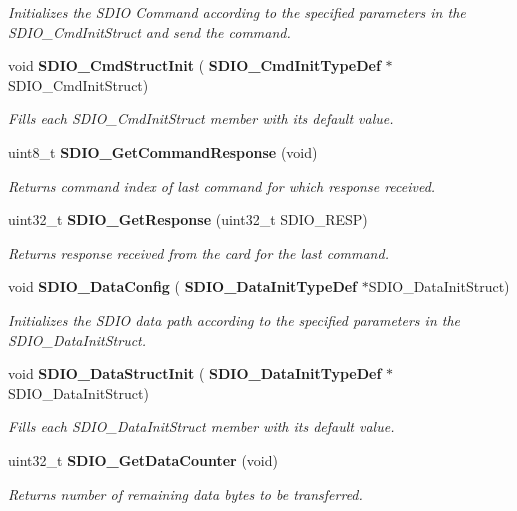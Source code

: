 \begin{DoxyCompactItemize}
\begin{DoxyCompactList}\small\item\em Initializes the S\+D\+IO Command according to the specified parameters in the S\+D\+I\+O\+\_\+\+Cmd\+Init\+Struct and send the command. \end{DoxyCompactList}\item 
void \textbf{ S\+D\+I\+O\+\_\+\+Cmd\+Struct\+Init} (\textbf{ S\+D\+I\+O\+\_\+\+Cmd\+Init\+Type\+Def} $\ast$S\+D\+I\+O\+\_\+\+Cmd\+Init\+Struct)
\begin{DoxyCompactList}\small\item\em Fills each S\+D\+I\+O\+\_\+\+Cmd\+Init\+Struct member with its default value. \end{DoxyCompactList}\item 
uint8\+\_\+t \textbf{ S\+D\+I\+O\+\_\+\+Get\+Command\+Response} (void)
\begin{DoxyCompactList}\small\item\em Returns command index of last command for which response received. \end{DoxyCompactList}\item 
uint32\+\_\+t \textbf{ S\+D\+I\+O\+\_\+\+Get\+Response} (uint32\+\_\+t S\+D\+I\+O\+\_\+\+R\+E\+SP)
\begin{DoxyCompactList}\small\item\em Returns response received from the card for the last command. \end{DoxyCompactList}\item 
void \textbf{ S\+D\+I\+O\+\_\+\+Data\+Config} (\textbf{ S\+D\+I\+O\+\_\+\+Data\+Init\+Type\+Def} $\ast$S\+D\+I\+O\+\_\+\+Data\+Init\+Struct)
\begin{DoxyCompactList}\small\item\em Initializes the S\+D\+IO data path according to the specified parameters in the S\+D\+I\+O\+\_\+\+Data\+Init\+Struct. \end{DoxyCompactList}\item 
void \textbf{ S\+D\+I\+O\+\_\+\+Data\+Struct\+Init} (\textbf{ S\+D\+I\+O\+\_\+\+Data\+Init\+Type\+Def} $\ast$S\+D\+I\+O\+\_\+\+Data\+Init\+Struct)
\begin{DoxyCompactList}\small\item\em Fills each S\+D\+I\+O\+\_\+\+Data\+Init\+Struct member with its default value. \end{DoxyCompactList}\item 
uint32\+\_\+t \textbf{ S\+D\+I\+O\+\_\+\+Get\+Data\+Counter} (void)
\begin{DoxyCompactList}\small\item\em Returns number of remaining data bytes to be transferred. \end{DoxyCompactList}\item 

\end{DoxyCompactItemize}
